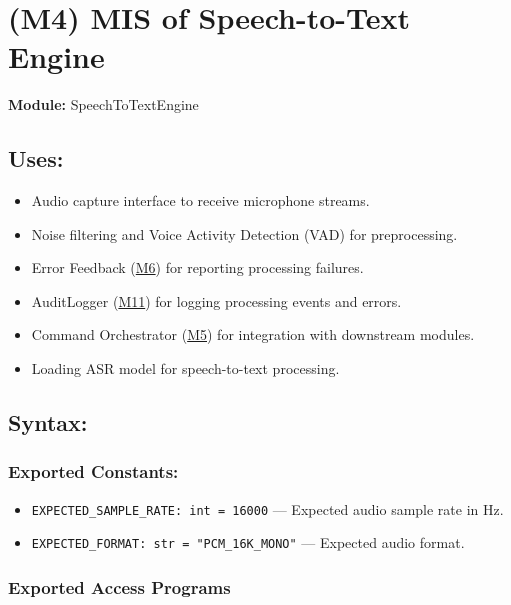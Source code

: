 \documentclass[12pt, titlepage]{article}
\begin{document}
\newpage
\section{(M4) MIS of Speech-to-Text Engine}
\label{M4}

\textbf{Module:} SpeechToTextEngine

\subsection{Uses:}
\begin{itemize}
  \item Audio capture interface to receive microphone streams.
  \item Noise filtering and Voice Activity Detection (VAD) for preprocessing.
  \item Error Feedback (\hyperref[M6]{M6}) for reporting processing failures.
  \item AuditLogger (\hyperref[M11]{M11}) for logging processing events and errors.
  \item Command Orchestrator (\hyperref[M5]{M5}) for integration with downstream modules.
  \item Loading ASR model for speech-to-text processing.
\end{itemize}

\subsection{Syntax:}

\subsubsection{Exported Constants:}
\begin{itemize}
  \item \texttt{EXPECTED\_SAMPLE\_RATE: int = 16000} — Expected audio sample rate in Hz.
  \item \texttt{EXPECTED\_FORMAT: str = "PCM\_16K\_MONO"} — Expected audio format.
\end{itemize}


\subsubsection{Exported Access Programs}
\end{document}
